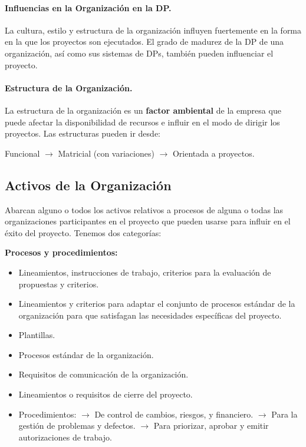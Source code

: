 \documentclass[10pt,a4paper]{article}
\begin{document}
\paragraph{Influencias en la Organización en la DP.}
La cultura, estilo y estructura de la organización influyen fuertemente en la forma en la que los proyectos son ejecutados. El grado de madurez de la DP de una organización, así como sus sistemas de DPs, también pueden influenciar el proyecto.

\paragraph{Estructura de la Organización.}
La estructura de la organización es un \textbf{factor ambiental} de la empresa que puede afectar la disponibilidad de recursos e influir en el modo de dirigir los proyectos. Las estructuras pueden ir desde:

Funcional $\rightarrow$ Matricial (con variaciones) $\rightarrow$ Orientada a proyectos.

\subsection{Activos de la Organización}
Abarcan alguno o todos los activos relativos a procesos de alguna o todas las
organizaciones participantes en el proyecto que pueden usarse para influir en el éxito del proyecto. Tenemos dos categorías:

\textbf{Procesos y procedimientos:}
\begin{itemize}
\item Lineamientos, instrucciones de trabajo, criterios para la evaluación de propuestas y criterios.
\item Lineamientos y criterios para adaptar el conjunto de procesos estándar de la organización para que satisfagan las necesidades específicas del proyecto.
\item Plantillas.
\item Procesos estándar de la organización.
\item Requisitos de comunicación de la organización.
\item Lineamientos o requisitos de cierre del proyecto.
\item Procedimientos:
\subitem $\rightarrow$ De control de cambios, riesgos, y financiero.
\subitem $\rightarrow$ Para la gestión de problemas y defectos.
\subitem $\rightarrow$ Para priorizar, aprobar y emitir autorizaciones de trabajo.
\end{itemize}
\end{document}
